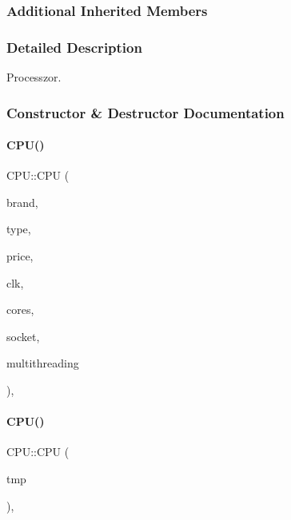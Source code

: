 \subsubsection*{Additional Inherited Members}


\subsubsection{Detailed Description}
Processzor. 

\subsubsection{Constructor \& Destructor Documentation}
\mbox{\label{class_c_p_u_a1aa85a6c976fe5b665dcb9fd6d8fdd1e}} 
\paragraph{\texorpdfstring{CPU()}{CPU()}\hspace{0.1cm}{\footnotesize\ttfamily [1/2]}}
{\footnotesize\ttfamily C\+P\+U\+::\+C\+PU (\begin{DoxyParamCaption}\item[{\mbox{\hyperlink{class_string}{String}}}]{brand,  }\item[{\mbox{\hyperlink{class_string}{String}}}]{type,  }\item[{int}]{price,  }\item[{int}]{clk,  }\item[{int}]{cores,  }\item[{\mbox{\hyperlink{class_string}{String}}}]{socket,  }\item[{bool}]{multithreading }\end{DoxyParamCaption})\hspace{0.3cm}{\ttfamily [inline]}, {\ttfamily [explicit]}}

\mbox{\label{class_c_p_u_a9147d84f815b9a242ba618877e6b2673}} 
\paragraph{\texorpdfstring{CPU()}{CPU()}\hspace{0.1cm}{\footnotesize\ttfamily [2/2]}}
{\footnotesize\ttfamily C\+P\+U\+::\+C\+PU (\begin{DoxyParamCaption}\item[{\mbox{\hyperlink{struct_temp_input}{Temp\+Input}} \&}]{tmp }\end{DoxyParamCaption})\hspace{0.3cm}{\ttfamily [inline]}, {\ttfamily [explicit]}}



